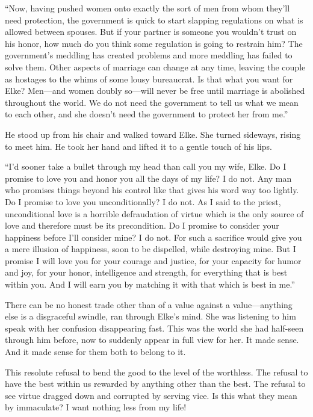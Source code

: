 ``Now, having pushed women onto exactly the sort of men from whom they'll need protection, the government is quick to start slapping regulations on what is allowed between spouses. But if your partner is someone you wouldn't trust on his honor, how much do you think some regulation is going to restrain him? The government's meddling has created problems and more meddling has failed to solve them. Other aspects of marriage can change at any time, leaving the couple as hostages to the whims of some lousy bureaucrat. Is that what you want for Elke? Men---and women doubly so---will never be free until marriage is abolished throughout the world. We do not need the government to tell us what we mean to each other, and she doesn't need the government to protect her from me.''

He stood up from his chair and walked toward Elke. She turned sideways, rising to meet him. He took her hand and lifted it to a gentle touch of his lips.

``I'd sooner take a bullet through my head than call you my wife, Elke. Do I promise to love you and honor you all the days of my life? I do not. Any man who promises things beyond his control like that gives his word way too lightly. Do I promise to love you unconditionally? I do not. As I said to the priest, unconditional love is a horrible defraudation of virtue which is the only source of love and therefore must be its precondition. Do I promise to consider your happiness before I'll consider mine? I do not. For such a sacrifice would give you a mere illusion of happiness, soon to be dispelled, while destroying mine. But I promise I will love you for your courage and justice, for your capacity for humor and joy, for your honor, intelligence and strength, for everything that is best within you. And I will earn you by matching it with that which is best in me.''

There can be no honest trade other than of a value against a value---anything else is a disgraceful swindle, ran through Elke's mind. She was listening to him speak with her confusion disappearing fast. This was the world she had half-seen through him before, now to suddenly appear in full view for her. It made sense. And it made sense for them both to belong to it.

This resolute refusal to bend the good to the level of the worthless. The refusal to have the best within us rewarded by anything other than the best. The refusal to see virtue dragged down and corrupted by serving vice. Is this what they mean by immaculate? I want nothing less from my life!

